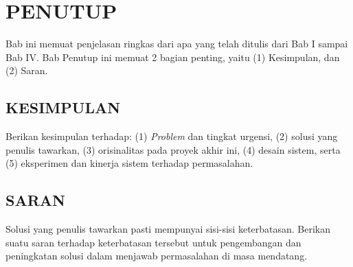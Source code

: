 \chapter{PENUTUP}

Bab ini memuat penjelasan ringkas dari apa yang telah ditulis dari Bab I sampai Bab IV.
Bab Penutup ini memuat 2 bagian penting, yaitu (1) Kesimpulan, dan (2) Saran.

\section{KESIMPULAN}

Berikan kesimpulan terhadap: (1) \textit{Problem} dan tingkat urgensi, (2) solusi yang
penulis tawarkan, (3) orisinalitas pada proyek akhir ini, (4) desain sistem, serta
(5) eksperimen dan kinerja sistem terhadap permasalahan.

\section{SARAN}

Solusi yang penulis tawarkan pasti mempunyai sisi-sisi keterbatasan. Berikan suatu
saran terhadap keterbatasan tersebut untuk pengembangan dan peningkatan solusi dalam
menjawab permasalahan di masa mendatang.